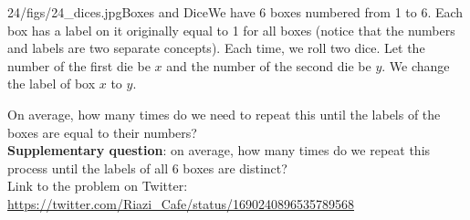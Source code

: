 \begin{problem}{24/figs/24_dices.jpg}{Boxes and Dice}We have 6 boxes numbered from 1 to 6. Each box has a label on it originally equal to 1 for all boxes (notice that the numbers and labels are two separate concepts). Each time, we roll two dice. Let the number of the first die be $x$ and the number of the second die be $y$. We change the label of box $x$ to $y$.

On average, how many times do we need to repeat this until the labels of the boxes are equal to their numbers?\\[0.2cm]

\textbf{Supplementary question}: on average, how many times do we repeat this process until the labels of all 6 boxes are distinct?\\[0.2cm]

Link to the problem on Twitter:  \url{https://twitter.com/Riazi_Cafe/status/1690240896535789568}\end{problem}